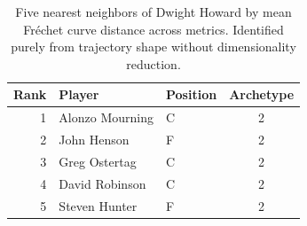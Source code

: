 \begin{table}[htbp]
  \centering\small
  \begin{tabular}{rllc}
    \toprule
    Rank & Player & Position & Archetype \\
    \midrule
    1 & Alonzo Mourning & C & 2 \\
    2 & John Henson & F & 2 \\
    3 & Greg Ostertag & C & 2 \\
    4 & David Robinson & C & 2 \\
    5 & Steven Hunter & F & 2 \\
    \bottomrule
  \end{tabular}
  \caption{Five nearest neighbors of Dwight Howard by mean Fr\'{e}chet curve distance across metrics. Identified purely from trajectory shape without dimensionality reduction.}
  \label{tab:Dwight_Howard_frechet_curve_neighbors}
\end{table}

